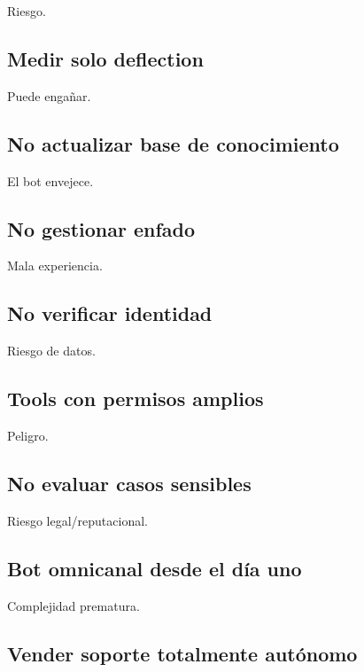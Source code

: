 Riesgo.

\subsection{Medir solo deflection}\label{medir-solo-deflection}

Puede engañar.

\subsection{No actualizar base de
conocimiento}\label{no-actualizar-base-de-conocimiento}

El bot envejece.

\subsection{No gestionar enfado}\label{no-gestionar-enfado}

Mala experiencia.

\subsection{No verificar identidad}\label{no-verificar-identidad}

Riesgo de datos.

\subsection{Tools con permisos
amplios}\label{tools-con-permisos-amplios}

Peligro.

\subsection{No evaluar casos
sensibles}\label{no-evaluar-casos-sensibles}

Riesgo legal/reputacional.

\subsection{Bot omnicanal desde el día
uno}\label{bot-omnicanal-desde-el-duxeda-uno}

Complejidad prematura.

\subsection{Vender soporte totalmente
autónomo}\label{vender-soporte-totalmente-autuxf3nomo}

